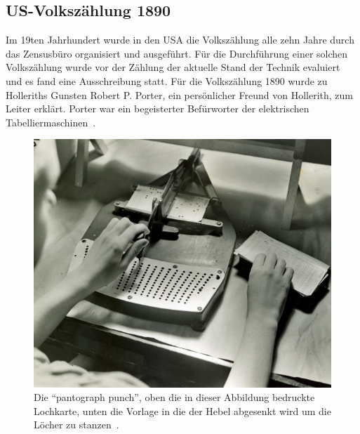 \documentclass[parskip=half]{scrartcl}
\begin{document}
\subsection{US-Volkszählung 1890}
\label{sec:1890}

Im 19ten Jahrhundert wurde in den USA die Volkszählung alle zehn Jahre durch
das Zensusbüro organisiert und ausgeführt. Für die Durchführung einer solchen
Volkszählung wurde vor der Zählung der aktuelle Stand der Technik evaluiert und
es fand eine Ausschreibung statt. Für die Volkszählung 1890 wurde zu Holleriths
Gunsten Robert P. Porter, ein persönlicher Freund von Hollerith, zum Leiter
erklärt. Porter war ein begeisterter Befürworter der elektrischen
Tabelliermaschinen~\cite{austrian1982herman}.

\begin{figure}[h]
  \centering
  \includegraphics[width=\textwidth]{pantograph}
  \caption{Die \enquote{pantograph punch}, oben die in dieser Abbildung
    bedruckte Lochkarte, unten die Vorlage in die der Hebel abgesenkt wird um
    die Löcher zu stanzen~\cite{pantograph}.}
  \label{fig:pantograph}
\end{figure}
\end{document}
